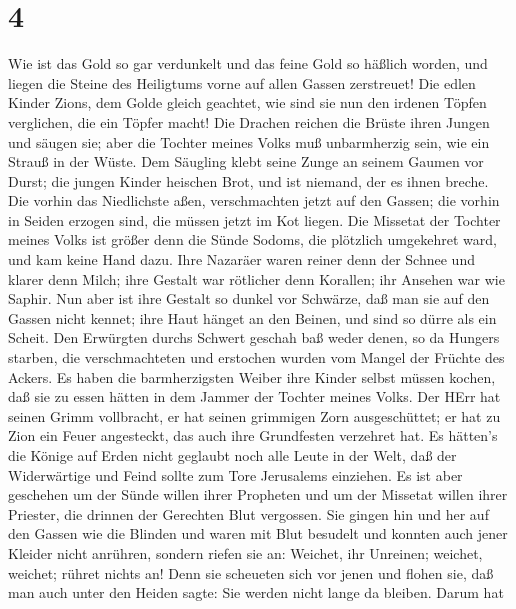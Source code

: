 \hypertarget{section-3}{%
\section{4}\label{section-3}}

 Wie ist das Gold so gar verdunkelt und das feine Gold so
häßlich worden, und liegen die Steine des Heiligtums vorne auf allen
Gassen zerstreuet!  Die edlen Kinder Zions, dem Golde gleich
geachtet, wie sind sie nun den irdenen Töpfen verglichen, die ein Töpfer
macht!  Die Drachen reichen die Brüste ihren Jungen und
säugen sie; aber die Tochter meines Volks muß unbarmherzig sein, wie ein
Strauß in der Wüste.  Dem Säugling klebt seine Zunge an
seinem Gaumen vor Durst; die jungen Kinder heischen Brot, und ist
niemand, der es ihnen breche.  Die vorhin das Niedlichste
aßen, verschmachten jetzt auf den Gassen; die vorhin in Seiden erzogen
sind, die müssen jetzt im Kot liegen.  Die Missetat der
Tochter meines Volks ist größer denn die Sünde Sodoms, die plötzlich
umgekehret ward, und kam keine Hand dazu.  Ihre Nazaräer
waren reiner denn der Schnee und klarer denn Milch; ihre Gestalt war
rötlicher denn Korallen; ihr Ansehen war wie Saphir.  Nun
aber ist ihre Gestalt so dunkel vor Schwärze, daß man sie auf den Gassen
nicht kennet; ihre Haut hänget an den Beinen, und sind so dürre als ein
Scheit.  Den Erwürgten durchs Schwert geschah baß weder
denen, so da Hungers starben, die verschmachteten und erstochen wurden
vom Mangel der Früchte des Ackers.  Es haben die
barmherzigsten Weiber ihre Kinder selbst müssen kochen, daß sie zu essen
hätten in dem Jammer der Tochter meines Volks.  Der HErr
hat seinen Grimm vollbracht, er hat seinen grimmigen Zorn ausgeschüttet;
er hat zu Zion ein Feuer angesteckt, das auch ihre Grundfesten verzehret
hat.  Es hätten's die Könige auf Erden nicht geglaubt noch
alle Leute in der Welt, daß der Widerwärtige und Feind sollte zum Tore
Jerusalems einziehen.  Es ist aber geschehen um der Sünde
willen ihrer Propheten und um der Missetat willen ihrer Priester, die
drinnen der Gerechten Blut vergossen.  Sie gingen hin und
her auf den Gassen wie die Blinden und waren mit Blut besudelt und
konnten auch jener Kleider nicht anrühren,  sondern riefen
sie an: Weichet, ihr Unreinen; weichet, weichet; rühret nichts an! Denn
sie scheueten sich vor jenen und flohen sie, daß man auch unter den
Heiden sagte: Sie werden nicht lange da bleiben.  Darum hat
